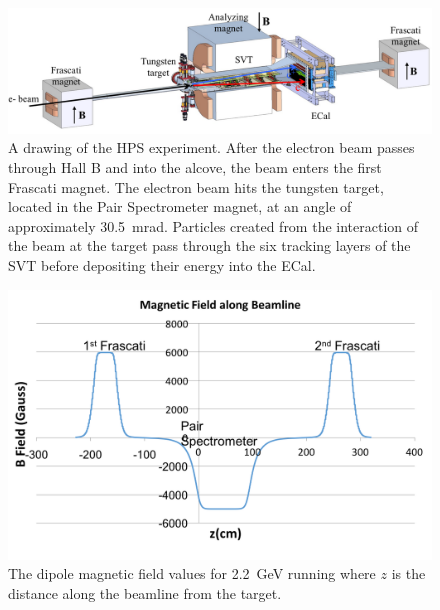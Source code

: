 \begin{figure}[htb]
  \centering
      \includegraphics[width=1.0\textwidth]{pics/experiment/hpsBeamline.png}
  \caption[HPS beamline]{A drawing of the HPS experiment. After the electron beam passes through Hall B and into the alcove, the beam enters the first Frascati magnet. The electron beam hits the tungsten target, located in the Pair Spectrometer magnet, at an angle of approximately 30.5~mrad. Particles created from the interaction of the beam at the target pass through the six tracking layers of the SVT before depositing their energy into the ECal.}
  \label{Figure:hpsBeamline}
\end{figure}

\begin{figure}[htb]
  \centering
      \includegraphics[width=1.0\textwidth]{pics/experiment/bfield.png}
  \caption[HPS magnetic fields]{The dipole magnetic field values for 2.2~GeV running where $z$ is the distance along the beamline from the target.}
  \label{Figure:bField}
\end{figure}

